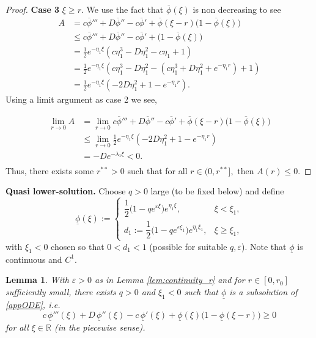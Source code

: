 \documentclass[12pt,letterpaper]{amsart}
\newtheorem{lemma}[theorem]{Lemma}
\theoremstyle{definition}
\theoremstyle{remark}
\numberwithin{equation}{section}
\begin{document}
\begin{proof}
\textbf{Case 3} $\xi\ge r.$ We use the fact that $\overline\phi(\xi)$ is non decreasing to see
\[
\begin{split}
 A&=c\overline\phi''' + D\overline\phi'' - c\overline\phi' + \overline\phi(\xi-r)\bigl(1-\overline\phi(\xi)\bigr)\\
 &\le c\overline\phi''' + D\overline\phi'' - c\overline\phi' +\bigl(1-\overline\phi(\xi)\bigr)\\
 &=\frac{1}{2} e^{-\eta_1 \xi} \left( c\eta_1^3 - D\eta_1^2 - c\eta_1 + 1 \right)\\
 &=\frac{1}{2} e^{-\eta_1 \xi} \left( c\eta_1^3 - D\eta_1^2 -\left(c\eta_1^3+D\eta_1^2+e^{-\eta_1 r}\right) + 1 \right)\\
 &=\frac{1}{2} e^{-\eta_1 \xi}\left(-2D\eta_1^2+1-e^{-\eta_1 r}\right).
\end{split}
\]
Using a limit argument as case 2 we see,

\[
\begin{split}
 \lim_{r\to 0}A&=\lim_{r\to 0} c\overline\phi''' + D\overline\phi'' - c\overline\phi' + \overline\phi(\xi-r)\bigl(1-\overline\phi(\xi)\bigr)\\
 &\le \lim_{r\to 0}\frac{1}{2} e^{-\eta_1 \xi}\left(-2D\eta_1^2+1-e^{-\eta_1 r}\right)\\
 &=-D e^{-\lambda_1 \xi}<0.\\
\end{split}
\]
 Thus, there exists some $r^{**}>0$ such that for all $r\in(0,r^{**}],$ then $A(r)\le 0.$
\end{proof}
 \noindent
 \textbf{Quasi lower-solution.} Choose $q>0$ large (to be fixed below) and define
 \[
 \underline{\phi}(\xi):=
 \begin{cases}
 	\dfrac{1}{2}\bigl(1-q e^{\varepsilon\xi}\bigr)e^{\eta_1\xi}, & \xi<\xi_1,\\[6pt]
 	d_1:=\dfrac{1}{2}\bigl(1-q e^{\varepsilon\xi_1}\bigr)e^{\eta_1\xi_1}, & \xi\ge\xi_1,
 \end{cases}
 \]
 with $\xi_1<0$ chosen so that $0<d_1<1$ (possible for suitable $q,\varepsilon$). Note that $\underline\phi$ is continuous and $C^1$.
 
 \begin{lemma}\label{lem:sub}
 	With $\varepsilon>0$ as in Lemma \ref{lem:continuity_r} and for $r\in[0,r_0]$ sufficiently small, there exists $q>0$ and $\xi_1<0$ such that $\underline\phi$ is a subsolution of \eqref{appODE}, i.e.
 	\[
 	c\,\underline\phi'''(\xi) + D\,\underline\phi''(\xi) - c\,\underline\phi'(\xi) + \underline\phi(\xi)\bigl(1-\underline\phi(\xi-r)\bigr)\ge 0
 	\]
 	for all $\xi\in\mathbb R$ (in the piecewise sense).
 \end{lemma}
 
\end{document}
